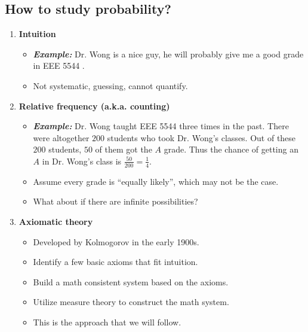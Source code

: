 \subsection{How to study probability?}
\begin{enumerate}
\item \textbf{Intuition}
\begin{itemize}
\item \emph{\bf{Example:} } Dr. Wong is a nice guy, he will probably give me a good grade in EEE 5544 .
\item Not systematic, guessing, cannot quantify.
\end{itemize}

\item \textbf{Relative frequency (a.k.a. counting)} 
\begin{itemize}
\item \emph{\bf{Example:} } Dr. Wong taught EEE 5544 three times in the
  past. There were altogether $200$ students who took Dr. Wong's
  classes. Out of these $200$ students, $50$ of them got the \(A\) grade.
  Thus the chance of getting an \(A\) in Dr. Wong's class is
  \(\frac{50}{200}=\frac{1}{4}\).
\item Assume every grade is ``equally likely'', which may not be the case.
\item What about if there are infinite possibilities?
\end{itemize}

\item \textbf{Axiomatic theory} 
\begin{itemize}
  \item Developed by Kolmogorov in the early 1900s.
  \item Identify a few basic axioms that fit intuition.
  \item Build a math consistent system based on the axioms.
  \item Utilize measure theory to construct the math system.
  \item This is the approach that we will follow.
\end{itemize}
\end{enumerate}

